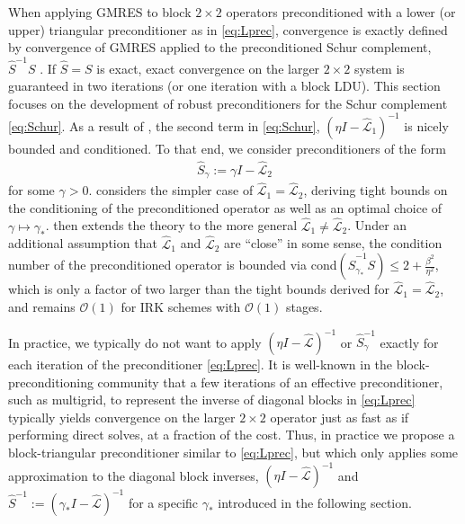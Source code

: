 \documentclass[review]{siamart}
\begin{document}
When applying GMRES to block $2\times 2$ operators preconditioned with a lower
(or upper) triangular preconditioner as in \eqref{eq:Lprec}, convergence
is exactly defined by convergence of GMRES applied to the preconditioned Schur
complement, $\widehat{S}^{-1}S$ \cite{2x2block}. If $\widehat{S} = S$ is exact,
exact convergence on the larger $2\times2$ system is guaranteed in two iterations
(or one iteration with a block LDU). This section focuses on the development of
robust preconditioners for the Schur complement \eqref{eq:Schur}. As a result of
, the second term in \eqref{eq:Schur},
$(\eta I - \widehat{\mathcal{L}}_1)^{-1}$ is nicely bounded and conditioned.
To that end, we consider preconditioners of the form
%
\begin{align*}
\widehat{S}_\gamma := \gamma I - \widehat{\mathcal{L}}_2
\end{align*}
%
for some $\gamma > 0$.  considers the simpler case
of $\widehat{\mathcal{L}}_1 = \widehat{\mathcal{L}}_2$, deriving tight bounds
on the conditioning of the preconditioned operator as well as an optimal choice
of $\gamma\mapsto\gamma_*$.  then extends the theory to
the more general $\widehat{\mathcal{L}}_1 \neq \widehat{\mathcal{L}}_2$.
Under an additional assumption that $\widehat{\mathcal{L}}_1$ and
$\widehat{\mathcal{L}}_2$ are ``close'' in some sense, the condition number
of the preconditioned operator is bounded via cond$(\widehat{S}_{\gamma_*}^{-1}S)
\leq 2 + \tfrac{\beta^2}{\eta^2}$, which is only a factor of two larger than
the tight bounds derived for $\widehat{\mathcal{L}}_1 = \widehat{\mathcal{L}}_2$,
and remains $\mathcal{O}(1)$ for IRK schemes with $\mathcal{O}(1)$ stages.


In practice, we typically do not want to apply $(\eta I - \widehat{\mathcal{L}})^{-1}$
or $\widehat{S}_\gamma^{-1}$ exactly for each iteration of the preconditioner
\eqref{eq:Lprec}. It is well-known in the block-preconditioning community
that a few iterations of an effective preconditioner, such as multigrid,
to represent the inverse of diagonal blocks in \eqref{eq:Lprec} typically
yields convergence on the larger $2\times 2$ operator just as fast as if
performing direct solves, at a fraction of the cost. Thus, in practice we
propose a block-triangular preconditioner similar to \eqref{eq:Lprec}, but
which only applies some approximation to the diagonal block inverses,
$(\eta I - \widehat{\mathcal{L}})^{-1}$ and
$\widehat{S}^{-1} := (\gamma_* I - \widehat{\mathcal{L}})^{-1}$ for a
specific $\gamma_*$ introduced in the following section.
\end{document}
